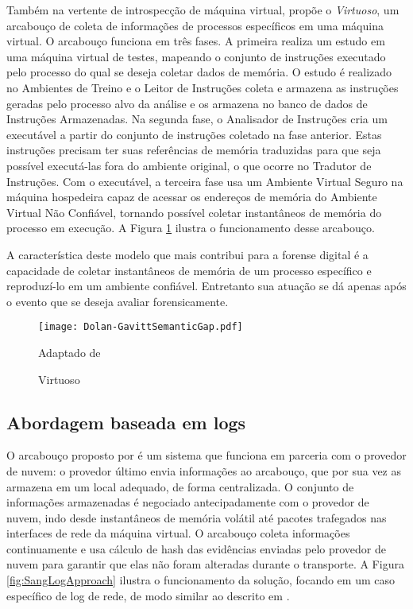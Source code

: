 Também na vertente de introspecção de máquina virtual, \cite{Dolan-GavittSemanticGap:2011} propõe o \textit{Virtuoso}, um arcabouço de coleta de informações de processos específicos em uma máquina virtual.
%
O arcabouço funciona em três fases.
%
A primeira realiza um estudo em uma máquina virtual de testes, mapeando o conjunto de instruções executado pelo processo do qual se deseja coletar dados de memória. 
%
O estudo é realizado no Ambientes de Treino e o Leitor de Instruções coleta e armazena as instruções geradas pelo processo alvo da análise e os armazena no banco de dados de Instruções Armazenadas.
%
Na segunda fase, o Analisador de Instruções cria um executável a partir do conjunto de instruções coletado na fase anterior. Estas instruções precisam ter suas referências de memória traduzidas para que seja possível executá-las fora do ambiente original, o que ocorre no Tradutor de Instruções.
%
Com o executável, a terceira fase usa um Ambiente Virtual Seguro na máquina hospedeira capaz de acessar os endereços de memória do Ambiente Virtual Não Confiável, tornando possível coletar instantâneos de memória do processo em execução.
%
A Figura \ref{fig:Dolan-GavittSemanticGap} ilustra o funcionamento desse arcabouço. 


A característica deste modelo que mais contribui para a forense digital é a capacidade de coletar instantâneos de memória de um processo específico e reproduzí-lo em um ambiente confiável. Entretanto  sua atuação se dá apenas após o evento que se deseja avaliar forensicamente.
%


\begin{figure}[htb!]
\footnotesize
\caption{Virtuoso}
\texttt{[image: Dolan-GavittSemanticGap.pdf]}
\centering
\label{fig:Dolan-GavittSemanticGap}
\begin{center}
Adaptado de \cite{Dolan-GavittSemanticGap:2011} 
\end{center}
\end{figure}


\subsection{Abordagem baseada em logs}
\label{sec:modelologs}

O arcabouço proposto por \cite{SangLogApproach:2013} é um sistema que funciona em parceria com o provedor de nuvem: o provedor último envia informações ao arcabouço, que por sua vez as armazena em um local adequado, de forma centralizada.
%
O conjunto de informações armazenadas é negociado antecipadamente com o provedor de nuvem, indo desde instantâneos de memória volátil até pacotes trafegados nas interfaces de rede da máquina virtual.
%
O arcabouço coleta informações continuamente e usa cálculo de hash das evidências enviadas pelo provedor de nuvem para garantir que elas não foram alteradas durante o transporte.
%
A Figura \ref{fig:SangLogApproach} ilustra o funcionamento da solução, focando em um caso específico de log de rede, de modo similar ao descrito em \cite{SangLogApproach:2013}.


